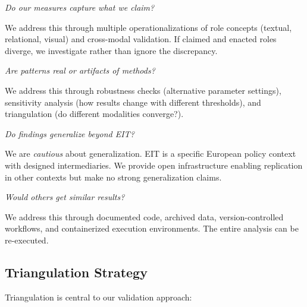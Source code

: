 \documentclass[../main.tex]{subfiles}
\begin{document}
\begin{description}[leftmargin=0.5cm, itemsep=0.4em]
\item[Construct validity] \textit{Do our measures capture what we claim?}

We address this through multiple operationalizations of role concepts (textual, relational, visual) and cross-modal validation. If claimed and enacted roles diverge, we investigate rather than ignore the discrepancy.

\item[Internal validity] \textit{Are patterns real or artifacts of methods?}

We address this through robustness checks (alternative parameter settings), sensitivity analysis (how results change with different thresholds), and triangulation (do different modalities converge?).

\item[External validity] \textit{Do findings generalize beyond EIT?}

We are \emph{cautious} about generalization. EIT is a specific European policy context with designed intermediaries. We provide open infrastructure enabling replication in other contexts but make no strong generalization claims.

\item[Reliability] \textit{Would others get similar results?}

We address this through documented code, archived data, version-controlled workflows, and containerized execution environments. The entire analysis can be re-executed.
\end{description}

\subsection{Triangulation Strategy}

Triangulation is central to our validation approach:
\end{document}
